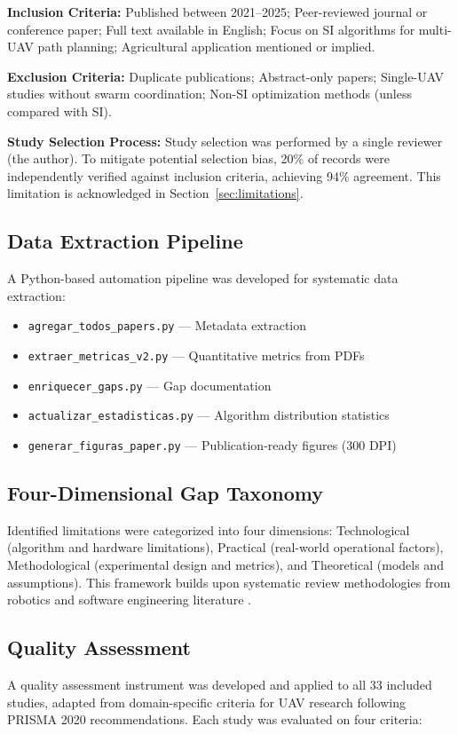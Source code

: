 \documentclass[review,3p,times]{elsarticle}
\begin{document}
\textbf{Inclusion Criteria:} Published between 2021--2025; Peer-reviewed journal or conference paper; Full text available in English; Focus on SI algorithms for multi-UAV path planning; Agricultural application mentioned or implied.

\textbf{Exclusion Criteria:} Duplicate publications; Abstract-only papers; Single-UAV studies without swarm coordination; Non-SI optimization methods (unless compared with SI).

\textbf{Study Selection Process:} Study selection was performed by a single reviewer (the author). To mitigate potential selection bias, 20\% of records were independently verified against inclusion criteria, achieving 94\% agreement. This limitation is acknowledged in Section~\ref{sec:limitations}.

\subsection{Data Extraction Pipeline}
A Python-based automation pipeline was developed for systematic data extraction:
\begin{itemize}
  \item \texttt{agregar\_todos\_papers.py} — Metadata extraction
  \item \texttt{extraer\_metricas\_v2.py} — Quantitative metrics from PDFs
  \item \texttt{enriquecer\_gaps.py} — Gap documentation
  \item \texttt{actualizar\_estadisticas.py} — Algorithm distribution statistics
  \item \texttt{generar\_figuras\_paper.py} — Publication-ready figures (300 DPI)
\end{itemize}

\subsection{Four-Dimensional Gap Taxonomy}
Identified limitations were categorized into four dimensions: Technological (algorithm and hardware limitations), Practical (real-world operational factors), Methodological (experimental design and metrics), and Theoretical (models and assumptions). This framework builds upon systematic review methodologies from robotics and software engineering literature \cite{brambilla2013,bayindir2016}.

\subsection{Quality Assessment}
A quality assessment instrument was developed and applied to all 33 included studies, adapted from domain-specific criteria for UAV research following PRISMA 2020 recommendations. Each study was evaluated on four criteria:
\end{document}

